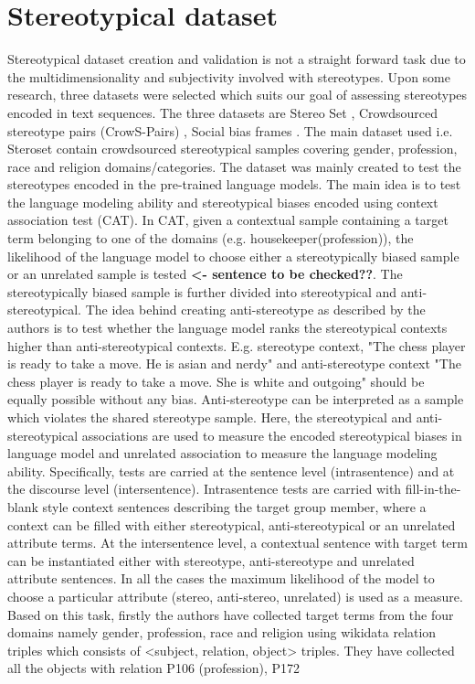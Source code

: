 \section{Stereotypical dataset}\label{stereotypical dataset}
Stereotypical dataset creation and validation is not a straight forward task due to the multidimensionality and subjectivity involved with stereotypes. Upon some research, three datasets were selected which suits our goal of assessing stereotypes encoded in text sequences. The three datasets are Stereo Set \cite{nadeem2020stereoset}, Crowdsourced stereotype pairs (CrowS-Pairs) \cite{nangia2020crows}, Social bias frames \cite{sap2019social}. The main dataset used i.e. Steroset \cite{nadeem2020stereoset} contain crowdsourced stereotypical samples covering gender, profession, race and religion domains/categories. The dataset was mainly created to test the stereotypes encoded in the pre-trained language models. The main idea is to test the language modeling ability and stereotypical biases encoded using context association test (CAT). In CAT, given a contextual sample containing a target term belonging to one of the domains (e.g. housekeeper(profession)), the likelihood of the language model to choose either a stereotypically biased sample or an unrelated sample is tested \textbf{<- sentence to be checked??}. The stereotypically biased sample is further divided into stereotypical and anti-stereotypical. The idea behind creating anti-stereotype as described by the authors is to test whether the language model ranks the stereotypical contexts higher than anti-stereotypical contexts. E.g. stereotype context, "The chess player is ready to take a move. He is asian and nerdy" and anti-stereotype context "The chess player is ready to take a move. She is white and outgoing" should be equally possible without any bias. Anti-stereotype can be interpreted as a sample which violates the shared stereotype sample. Here, the stereotypical and anti-stereotypical associations are used to measure the encoded stereotypical biases in language model and unrelated association to measure the language modeling ability. Specifically, tests are carried at the sentence level (intrasentence) and at the discourse level (intersentence). Intrasentence tests are carried with fill-in-the-blank style context sentences describing the target group member, where a context can be filled with either stereotypical, anti-stereotypical or an unrelated attribute terms. At the intersentence level, a contextual sentence with target term can be instantiated either with stereotype, anti-stereotype and unrelated attribute sentences. In all the cases the maximum likelihood of the model to choose a particular attribute (stereo, anti-stereo, unrelated) is used as a measure. Based on this task, firstly the authors have collected target terms from the four domains namely gender, profession, race and religion using wikidata relation triples \cite{vrandevcic2014wikidata} which consists of <subject, relation, object> triples. They have collected all the objects with relation P106 (profession), P172
